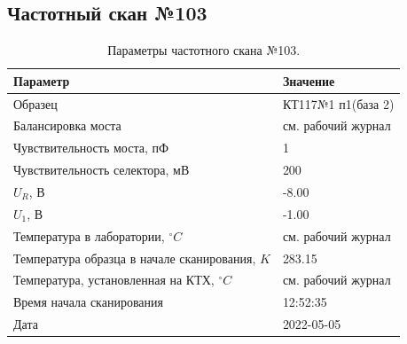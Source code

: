\subsection{Частотный скан №103}
\begin{table}[!ht]
    \centering
    \caption{Параметры частотного скана №103.}
    \begin{tabular}{|l|l|}
        \hline
        Параметр                                       & Значение                  \\ \hline
        Образец                                        & КТ117№1 п1(база 2)        \\ \hline
        Балансировка моста                             & см. рабочий журнал        \\ \hline
        Чувствительность моста, пФ                     & 1                         \\ \hline
        Чувствительность селектора, мВ                 & 200                       \\ \hline
        $U_R$, В                                       & -8.00                     \\ \hline
        $U_1$, В                                       & -1.00                     \\ \hline
        Температура в лаборатории, $^\circ C$          & см. рабочий журнал        \\ \hline
        Температура образца в начале сканирования, $K$ & 283.15                    \\ \hline
        Температура, установленная на КТХ, $^\circ C$  & см. рабочий журнал        \\ \hline
        Время начала сканирования                      & 12:52:35                  \\ \hline
        Дата                                           & 2022-05-05                \\ \hline
    \end{tabular}
    \label{table:frequency_scan_103}
\end{table}

